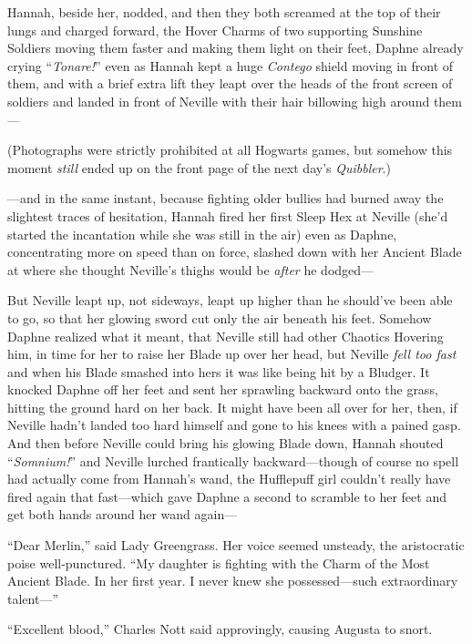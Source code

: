 Hannah, beside her, nodded, and then they both screamed at the top of their lungs and charged forward, the Hover Charms of two supporting Sunshine Soldiers moving them faster and making them light on their feet, Daphne already crying “\emph{Tonare!}” even as Hannah kept a huge \emph{Contego} shield moving in front of them, and with a brief extra lift they leapt over the heads of the front screen of soldiers and landed in front of Neville with their hair billowing high around them—

(Photographs were strictly prohibited at all Hogwarts games, but somehow this moment \emph{still} ended up on the front page of the next day’s \emph{Quibbler}.)

—and in the same instant, because fighting older bullies had burned away the slightest traces of hesitation, Hannah fired her first Sleep Hex at Neville (she’d started the incantation while she was still in the air) even as Daphne, concentrating more on speed than on force, slashed down with her Ancient Blade at where she thought Neville’s thighs would be \emph{after} he dodged—

But Neville leapt up, not sideways, leapt up higher than he should’ve been able to go, so that her glowing sword cut only the air beneath his feet. Somehow Daphne realized what it meant, that Neville still had other Chaotics Hovering him, in time for her to raise her Blade up over her head, but Neville \emph{fell too fast} and when his Blade smashed into hers it was like being hit by a Bludger. It knocked Daphne off her feet and sent her sprawling backward onto the grass, hitting the ground hard on her back. It might have been all over for her, then, if Neville hadn’t landed too hard himself and gone to his knees with a pained gasp. And then before Neville could bring his glowing Blade down, Hannah shouted “\emph{Somnium!}” and Neville lurched frantically backward—though of course no spell had actually come from Hannah’s wand, the Hufflepuff girl couldn’t really have fired again that fast—which gave Daphne a second to scramble to her feet and get both hands around her wand again—

\later

“Dear Merlin,” said Lady Greengrass. Her voice seemed unsteady, the aristocratic poise well-punctured. “My daughter is fighting with the Charm of the Most Ancient Blade. In her first year. I never knew she possessed—such extraordinary talent—”

“Excellent blood,” Charles Nott said approvingly, causing Augusta to snort.

